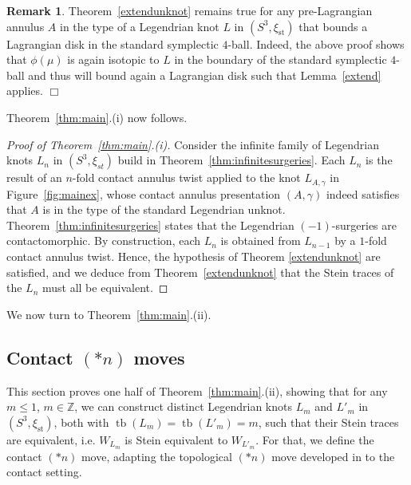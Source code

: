 \documentclass[11pt]{amsart} %
\DeclareMathOperator{\tb}{tb}
\newcommand{\Z}{\mathbb{Z}}
\newcommand{\xist}{\xi_{\mathrm{st}}}
\theoremstyle{plain}
\theoremstyle{definition}
\newtheorem{rem}[Theorem]{Remark}
\begin{document}
\begin{rem}
	Theorem~\ref{extendunknot} remains true for any pre-Lagrangian annulus $A$ in the type of a Legendrian knot $L$ in $(S^3,\xist)$ that bounds a Lagrangian disk in the standard symplectic $4$-ball. Indeed, the above proof shows that $\phi(\mu)$ is again isotopic to $L$ in the boundary of the standard symplectic $4$-ball and thus will bound again a Lagrangian disk such that Lemma~\ref{extend} applies. \hfill$\Box$
	
\end{rem}

Theorem~\ref{thm:main}.(i) now follows.

\begin{proof}[Proof of Theorem~\ref{thm:main}.(i)]
Consider the infinite family of Legendrian knots $L_n$ in $(S^3,\xi_{st})$ build in Theorem~\ref{thm:infinitesurgeries}. Each $L_n$ is the result of an $n$-fold contact annulus twist applied to the knot $L_{A,\gamma}$ in Figure~\ref{fig:mainex}, whose contact annulus presentation $(A,\gamma)$ indeed satisfies that $A$ is in the type of the standard Legendrian unknot. Theorem~\ref{thm:infinitesurgeries} states that the Legendrian $(-1)$-surgeries are contactomorphic. By construction, each $L_n$ is obtained from $L_{n-1}$ by a $1$-fold contact annulus twist. Hence, the hypothesis of Theorem \ref{extendunknot} are satisfied, and we deduce from Theorem~\ref{extendunknot} that the Stein traces of the $L_n$ must all be equivalent. 
\end{proof}

We now turn to Theorem~\ref{thm:main}.(ii).

\subsection{Contact $(*n)$ moves}\label{starmove}
This section proves one half of Theorem~\ref{thm:main}.(ii), showing that for any $m\leq 1$, $m\in \Z$, we can construct distinct Legendrian knots $L_m$ and $L'_m$ in $(S^3,\xist)$, both with $\tb(L_m)=\tb(L'_m)=m$, such that their Stein traces are equivalent, i.e. $W_{L_m}$ is Stein equivalent to $W_{L'_m}$. For that, we define the contact $(*n)$ move, adapting the topological $(*n)$ move developed in \cite[Section 3]{AbeJongLueckeOsoinach15} to the contact setting. 
\end{document}
